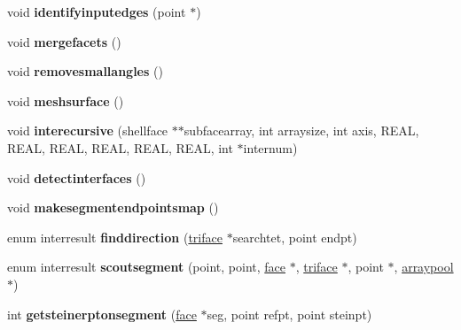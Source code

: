 \begin{DoxyCompactItemize}
\mbox{\label{classtetgenmesh_a7e53ef67a89dd9a223ef1888d26a91df}} 
void {\bfseries identifyinputedges} (point $\ast$)
\item 
\mbox{\label{classtetgenmesh_a5abff2e7fa8ae0632729d11f61c9f2a8}} 
void {\bfseries mergefacets} ()
\item 
\mbox{\label{classtetgenmesh_ac10cea7f84363cb47cc4639d5c384cc1}} 
void {\bfseries removesmallangles} ()
\item 
\mbox{\label{classtetgenmesh_a0c51cd3511d2b0ef9d0d45fe8b546b2e}} 
void {\bfseries meshsurface} ()
\item 
\mbox{\label{classtetgenmesh_a46c5e7f1f3f94dd0c493f2b559671854}} 
void {\bfseries interecursive} (shellface $\ast$$\ast$subfacearray, int arraysize, int axis, R\+E\+AL, R\+E\+AL, R\+E\+AL, R\+E\+AL, R\+E\+AL, R\+E\+AL, int $\ast$internum)
\item 
\mbox{\label{classtetgenmesh_a854e8e8d77d2d1b2b74372a87a1a7717}} 
void {\bfseries detectinterfaces} ()
\item 
\mbox{\label{classtetgenmesh_ac56b6a4bdcc053b5cc6afc005c8e1a69}} 
void {\bfseries makesegmentendpointsmap} ()
\item 
\mbox{\label{classtetgenmesh_a4a33553a18b0e9535d43d683b9473cbf}} 
enum interresult {\bfseries finddirection} (\hyperlink{classtetgenmesh_1_1triface}{triface} $\ast$searchtet, point endpt)
\item 
\mbox{\label{classtetgenmesh_a24e0775644874379052d8c04f418892d}} 
enum interresult {\bfseries scoutsegment} (point, point, \hyperlink{classtetgenmesh_1_1face}{face} $\ast$, \hyperlink{classtetgenmesh_1_1triface}{triface} $\ast$, point $\ast$, \hyperlink{classtetgenmesh_1_1arraypool}{arraypool} $\ast$)
\item 
\mbox{\label{classtetgenmesh_ac06ee6fd9ced44e8e9c5bb520c5c2c7f}} 
int {\bfseries getsteinerptonsegment} (\hyperlink{classtetgenmesh_1_1face}{face} $\ast$seg, point refpt, point steinpt)
\item 
$$
\end{DoxyCompactItemize}
